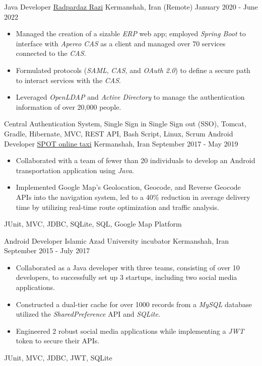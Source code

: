 \begin{experiences}
  \emptySeparator 
\experience
{}
{Java Developer}
{\href{https://raadpardaz.ir/}{Radpardaz Razi}}
{Kermanshah, Iran {\scriptsize{(Remote)}} \hspace{148 pt} January 2020 - June 2022}
{}
{
\begin{itemize}
\item Managed the creation of a sizable \emph{ERP} web app; employed \emph{Spring Boot} to interface with \emph{Apereo CAS} as a client and managed over 70 services connected to the \emph{CAS}.
\item Formulated protocols (\emph{SAML}, \emph{CAS}, and \emph{OAuth 2.0}) to define a secure path to interact services with the \textit{CAS}.
\item Leveraged \emph{OpenLDAP} and \emph{Active Directory} to manage the authentication information of over 20,000 people.
\end{itemize}
}{Central Authentication System, Single Sign in Single Sign out (SSO), Tomcat, Gradle, Hibernate, MVC, REST API, Bash Script, Linux, Scrum}
\emptySeparator
\experience
  {}
  {Android Developer}
  {\href{https://www.spotbar.ir/}{SPOT online taxi}}
  {Kermanshah, Iran \hspace{144 pt} September 2017 - May 2019}
  {}
  {
  \begin{itemize}
    \item Collaborated with a team of fewer than 20 individuals to develop an Android transportation application using \emph{Java}.
    \item Implemented Google Map's Geolocation, Geocode, and Reverse Geocode APIs into the navigation system, led to a 40\% reduction in average delivery time by utilizing real-time route optimization and traffic analysis. \end{itemize}
  }{JUnit, MVC, JDBC, SQLite, SQL, Google Map Platform}

\emptySeparator

\experience
{}
{Android Developer}
{Islamic Azad University incubator}
{Kermanshah, Iran \hspace{72 pt} September 2015 - July 2017}
{}
{
\begin{itemize}
  \item Collaborated as a Java developer with three teams, consisting of over 10 developers, to successfully set up 3 startups, including two social media applications.
\item Constructed a dual-tier cache for over 1000 records from a \emph{MySQL} database utilized the \emph{SharedPreference} API and \emph{SQLite}.
\item Engineered 2 robust social media applications while implementing a \emph{JWT} token to secure their APIs.
\end{itemize}
}{JUnit, MVC, JDBC, JWT, SQLite}
\end{experiences}